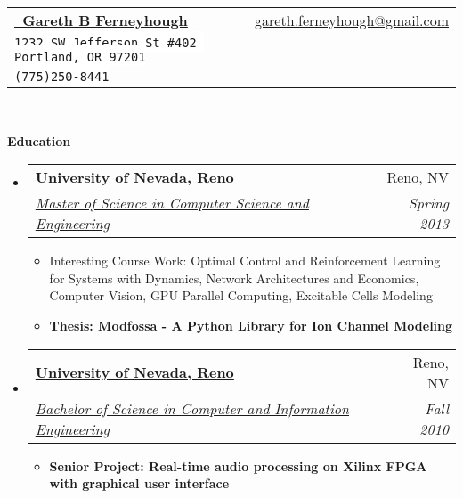 \documentclass[letterpaper,11pt]{article}
\makeatletter
\newcommand{\resitem}[1]{\item #1 \vspace{-2pt}}
\newcommand{\resheading}[1]{{\normalsize \colorbox{mygrey}{\begin{minipage}{\textwidth}{\textbf{#1 \vphantom{p\^{E}}}}\end{minipage}}}}
\newcommand{\ressubheading}[4]{
\begin{tabular*}{6.5in}{l@{\extracolsep{\fill}}r}
		\textbf{#1} & #2 \\
		\textit{#3} & \textit{#4} \\
\end{tabular*}\vspace{-6pt}}
\makeatother
\begin{document}
\newcommand{\mywebheader}{
\begin{tabular*}{7in}{l@{\extracolsep{\fill}}r}
	\textbf{\href{http://linkedin.com/in/gferneyhough}{\ Gareth B Ferneyhough}} & \href{mailto:gareth.ferneyhough@gmail.com}{gareth.ferneyhough@gmail.com}\\
	{\footnotesize \texttt{\colorbox{white}{1232 SW Jefferson St \#402 Portland, OR 97201}}} &  \\
	{\footnotesize \texttt{\colorbox{white}{(775)250-8441}}}
	\end{tabular*}
\\
\vspace{0.1in}}

\mywebheader

\resheading{Education}
	\begin{itemize}
		\item
			\ressubheading{\href{http://www.unr.edu/}{University of Nevada, Reno}}{Reno, NV}{\href{http://www.cse.unr.edu/academics/graduate/cesms.html}{Master of Science in Computer Science and Engineering}}{Spring 2013}
				{ \footnotesize
				\begin{itemize}
				  \resitem{Interesting Course Work: Optimal Control and Reinforcement Learning for Systems with Dynamics, Network Architectures and Economics, Computer Vision, GPU Parallel Computing, Excitable Cells Modeling}
				  \resitem{\textbf{Thesis: Modfossa - A Python Library for Ion Channel Modeling}}
				\end{itemize}
				}
		\item
			\ressubheading{\href{http://www.unr.edu/}{University of Nevada, Reno}}{Reno, NV}{\href{http://www.cse.unr.edu/academics/undergraduate/ciebs.html}{Bachelor of Science in Computer and Information Engineering}}{Fall 2010}
				{ \footnotesize
				\begin{itemize}
				  \resitem{\textbf{Senior Project: Real-time audio processing on Xilinx FPGA with graphical user interface}}
				\end{itemize}
				}
	\end{itemize} %
\end{document}

